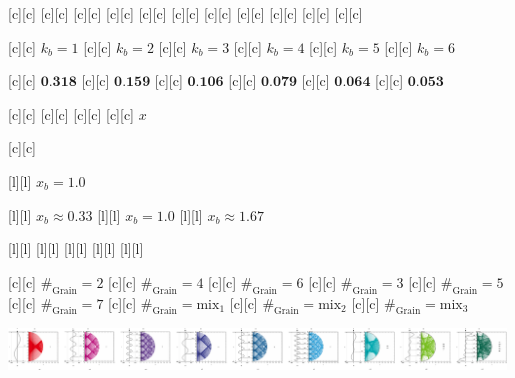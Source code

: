  [c][c] {}
 [c][c] {}
 [c][c] {}
 [c][c] {}
 [c][c] {}
[c][c] {}
[c][c] {}
[c][c] {}
[c][c] {}
[c][c] {}
[c][c] {}



[c][c] {\tiny $k_{b} = 1$}
[c][c] {\tiny $k_{b} = 2$}
[c][c] {\tiny $k_{b} = 3$}
[c][c] {\tiny $k_{b} = 4$}
[c][c] {\tiny $k_{b} = 5$}
[c][c] {\tiny $k_{b} = 6$}

[c][c] {\tiny $\textbf{0.318}$}
[c][c] {\tiny $\textbf{0.159}$}
[c][c] {\tiny $\textbf{0.106}$}
[c][c] {\tiny $\textbf{0.079}$}
[c][c] {\tiny $\textbf{0.064}$}
[c][c] {\tiny $\textbf{0.053}$}

[c][c] {}
[c][c] {}
[c][c]   {}
[c][c]   {\tiny $x$}

[c][c]  {}

[l][l] {\tiny $x_{b} = 1.0$}

[l][l] {\tiny $x_{b} \approx 0.33$}
[l][l] {\tiny $x_{b} = 1.0$}
[l][l] {\tiny $x_{b} \approx 1.67$}

[l][l] {}
[l][l] {}
[l][l] {}
[l][l] {}
[l][l] {}

[c][c] {\footnotesize $\#_{\text{Grain}}=2$}
[c][c] {\footnotesize $\#_{\text{Grain}}=4$}
[c][c] {\footnotesize $\#_{\text{Grain}}=6$}
[c][c] {\footnotesize $\#_{\text{Grain}}=3$}
[c][c] {\footnotesize $\#_{\text{Grain}}=5$}
[c][c] {\footnotesize $\#_{\text{Grain}}=7$}
[c][c] {\footnotesize $\#_{\text{Grain}}=\text{mix}_1$}
[c][c] {\footnotesize $\#_{\text{Grain}}=\text{mix}_2$}
[c][c] {\footnotesize $\#_{\text{Grain}}=\text{mix}_3$}

\includegraphics[width=0.99\textwidth]{characsin_rotate_semicircle_135246mix_horizontal.eps}